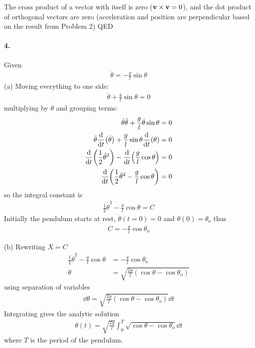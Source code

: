 \documentclass[../hw.tex]{subfiles}
\begin{document}
The cross product of a vector with itself is zero ($\mathbf{v} \times \mathbf{v} = 0$), and the dot 
product of orthogonal vectors are zero (acceleration and position are perpendicular based on the
result from Problem 2) QED

\paragraph{4.} Given
\begin{align*} \tag{3}
    \ddot \theta = -\frac{g}{l} \sin \theta
\end{align*}
(a) Moving everything to one side:
\begin{align*}
    \ddot \theta + \frac{g}{l} \sin \theta = 0
\end{align*}
multiplying by $\dot\theta$ and grouping terms:
\begin{align*}
    \dot\theta \ddot \theta + \frac{g}{l} \dot\theta \sin \theta &= 0 \\
    \dot\theta \dv{t}(\dot\theta) + \frac{g}{l} \sin\theta \dv{t}(\theta) &= 0 \\
    \dv{t}(\frac{1}{2} \dot\theta^2) - \dv{t}(\frac{g}{l} \cos\theta) &= 0 \\
    \dv{t}(\frac{1}{2} \dot\theta^2 - \frac{g}{l} \cos\theta) &= 0
\end{align*}
so the integral constant is
\begin{align*}
    \frac{1}{2} \dot\theta^2 - \frac{g}{l} \cos\theta = C
\end{align*}
Initially the pendulum starts at rest, $\dot\theta(t=0) = 0$ and $\theta(0) = \theta_o$ thus
\begin{align*}
    \boxed{C = -\frac{g}{l} \cos\theta_o}
\end{align*}

(b) Rewriting $X=C$
\begin{align*}
    \frac{1}{2} \dot\theta^2 - \frac{g}{l} \cos\theta &= -\frac{g}{l} \cos\theta_o \\
    \dot\theta &= \sqrt{\frac{2g}{l} (\cos\theta - \cos\theta_o)}
\end{align*}
using separation of variables
\begin{align*}
    \dd{\theta} = \sqrt{\frac{2g}{l} (\cos\theta - \cos\theta_o)} \dd{t}
\end{align*}
Integrating gives the analytic solution
\begin{align*}
    \boxed{\theta(t) = \sqrt{\frac{2g}{l}} \int_0^T \sqrt{\cos\theta - \cos\theta_o} \dd{t}}
\end{align*}
where $T$ is the period of the pendulum.
\end{document}
